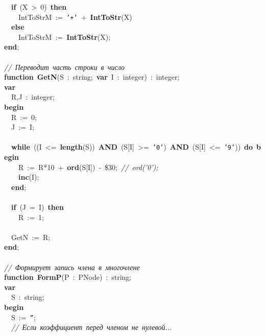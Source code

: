 \mbox{}\ \ \textbf{if}\ (X\ \textgreater{}\ 0)\ \textbf{then} \\
\mbox{}\ \ \ \ IntToStrM\ :=\ \texttt{'+'}\ +\ \textbf{IntToStr}(X) \\
\mbox{}\ \ \textbf{else} \\
\mbox{}\ \ \ \ IntToStrM\ :=\ \textbf{IntToStr}(X); \\
\mbox{}\textbf{end}; \\
\mbox{} \\
\mbox{}\textit{//\ Переводит\ часть\ строки\ в\ число} \\
\mbox{}\textbf{function}\ \textbf{GetN}(S\ :\ string;\ \textbf{var}\ I\ :\ integer)\ :\ integer; \\
\mbox{}\textbf{var} \\
\mbox{}\ \ R,J\ :\ integer; \\
\mbox{}\textbf{begin} \\
\mbox{}\ \ R\ :=\ 0; \\
\mbox{}\ \ J\ :=\ I; \\
\mbox{} \\
\mbox{}\ \ \textbf{while}\ ((I\ \textless{}=\ \textbf{length}(S))\ \textbf{AND}\ (S[I]\ \textgreater{}=\ \texttt{'0'})\ \textbf{AND}\ (S[I]\ \textless{}=\ \texttt{'9'}))\ \textbf{do}\ \textbf{begin} \\
\mbox{}\ \ \ \ R\ :=\ R*10\ +\ \textbf{ord}(S[I])\ -\ \$30;\ \textit{//\ ord('0');} \\
\mbox{}\ \ \ \ \textbf{inc}(I); \\
\mbox{}\ \ \textbf{end}; \\
\mbox{}\  \\
\mbox{}\ \ \textbf{if}\ (J\ =\ I)\ \textbf{then} \\
\mbox{}\ \ \ \ R\ :=\ 1; \\
\mbox{} \\
\mbox{}\ \ GetN\ :=\ R; \\
\mbox{}\textbf{end}; \\
\mbox{} \\
\mbox{}\textit{//\ Формирует\ запись\ члена\ в\ многочлене} \\
\mbox{}\textbf{function}\ \textbf{FormP}(P\ :\ PNode)\ :\ string; \\
\mbox{}\textbf{var} \\
\mbox{}\ \ S\ :\ string; \\
\mbox{}\textbf{begin} \\
\mbox{}\ \ S\ :=\ \texttt{''}; \\
\mbox{}\ \ \textit{//\ Если\ коэффициент\ перед\ членом\ не\ нулевой...} \\
